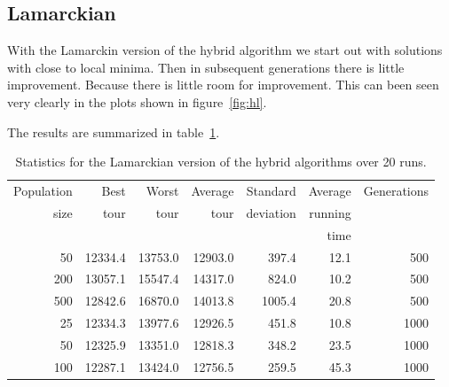 \documentclass[a4paper]{article}
\begin{document}
\newpage

\subsection*{Lamarckian}

With the Lamarckin version of the hybrid algorithm we start out with
solutions with close to local minima. Then in subsequent generations
there is little improvement. Because there is little room for improvement.
This can been seen very clearly in the plots shown in figure~\ref{fig:hl}.

The results are summarized in table~\ref{tab:hl}.

\begin{table}[h]
  \centering
  \begin{tabular}{rrrrrrr}
    Population & Best & Worst & Average &
    Standard & Average & Generations \\
    size & tour & tour & tour & deviation & running & \\
    & & & & & time & \\
    \hline
    50 & 12334.4 & 13753.0 & 12903.0 & 397.4 & 12.1  & 500 \\
    200 & 13057.1 & 15547.4 & 14317.0 & 824.0 & 10.2 & 500 \\
    500 & 12842.6 & 16870.0 & 14013.8 & 1005.4 & 20.8 & 500 \\
    25 & 12334.3 & 13977.6 & 12926.5 & 451.8 & 10.8 & 1000 \\
    50 & 12325.9 & 13351.0 & 12818.3 & 348.2 & 23.5 & 1000 \\
    100 & 12287.1 & 13424.0 & 12756.5 & 259.5 & 45.3 & 1000 \\
  \end{tabular}
  \caption{Statistics for the Lamarckian version of the hybrid algorithms
    over 20 runs.}
  \label{tab:hl}
\end{table}
\end{document}

